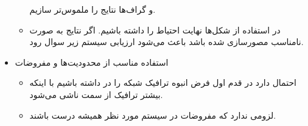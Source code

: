 \begin{itemize}
\begin{itemize}
        و گراف‌ها نتایج را ملموس‌تر سازیم.
        \item در استفاده از شکل‌ها نهایت احتیاط را داشته باشیم. اگر نتایج به
        صورت نامناسب مصورسازی شده باشد باعث می‌شود ارزیابی سیستم زیر سوال رود.
    \end{itemize}
    \item استفاده مناسب از محدودیت‌ها و مفروضات
    \begin{itemize}
        \item احتمال دارد در قدم اول فرض انبوه ترافیک شبکه را در  داشته
        باشیم با اینکه بیشتر ترافیک از سمت  ناشی می‌شود.
        \item لزومی ندارد که مفروضات در سیستم مورد نظر همیشه درست باشند.
    \end{itemize}
\end{itemize}
